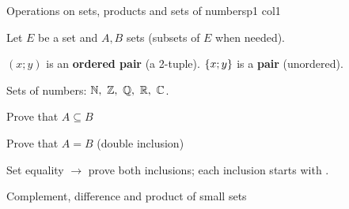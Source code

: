 \documentclass[course,noautoquant,noautokw]{neyvia-study}
\begin{document}
\maketitle

\begin{concept}[1.1]{Operations on sets, products and sets of numbers}{p1 col1}
\begin{definition}
\noindent Let $E$ be a set and $A,B$ sets (subsets of $E$ when needed).
\par\noindent $(x;y)$ is an \textbf{ordered pair} (a 2-tuple). $\left\{x;y\right\}$ is a \textbf{pair} (unordered).
\par\noindent Sets of numbers: $\N,\ \Z,\ \Q,\ \R,\ \C$.
\end{definition}
\begin{method}{Prove that $A\subseteq B$}
\step{$\displaystyle \cdots$}
\end{method}
\begin{method}{Prove that $A=B$ (double inclusion)}
\end{method}
\begin{reflex}
Set equality \ensuremath{\rightarrow} prove both inclusions; each inclusion starts with .
\end{reflex}
\begin{worked}{Complement, difference and product of small sets}

\end{worked}
\end{concept}
\end{document}
